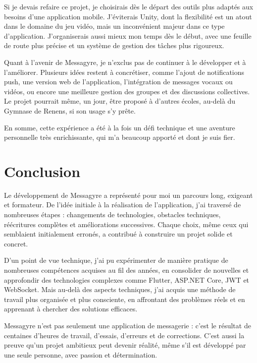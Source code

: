 \documentclass[12pt]{report}
\begin{document}
	Si je devais refaire ce projet, je choisirais dès le départ des outils plus adaptés aux besoins d’une application mobile. J’éviterais Unity, dont la flexibilité est un atout dans le domaine du jeu vidéo, mais un inconvénient majeur dans ce type d’application. J’organiserais aussi mieux mon temps dès le début, avec une feuille de route plus précise et un système de gestion des tâches plus rigoureux.
	
	Quant à l’avenir de Messagyre, je n’exclus pas de continuer à le développer et à l’améliorer. Plusieurs idées restent à concrétiser, comme l’ajout de notifications push, une version web de l’application, l’intégration de messages vocaux ou vidéos, ou encore une meilleure gestion des groupes et des discussions collectives. Le projet pourrait même, un jour, être proposé à d’autres écoles, au-delà du Gymnase de Renens, si son usage s’y prête.
	
	En somme, cette expérience a été à la fois un défi technique et une aventure personnelle très enrichissante, qui m’a beaucoup apporté et dont je suis fier.
	
	
	\chapter{Conclusion}
	
	Le développement de Messagyre a représenté pour moi un parcours long, exigeant et formateur. De l’idée initiale à la réalisation de l’application, j’ai traversé de nombreuses étapes : changements de technologies, obstacles techniques, réécritures complètes et améliorations successives. Chaque choix, même ceux qui semblaient initialement erronés, a contribué à construire un projet solide et concret.
	
	D’un point de vue technique, j’ai pu expérimenter de manière pratique de nombreuses compétences acquises au fil des années, en consolider de nouvelles et approfondir des technologies complexes comme Flutter, ASP.NET Core, JWT et WebSocket. Mais au-delà des aspects techniques, j’ai acquis une méthode de travail plus organisée et plus consciente, en affrontant des problèmes réels et en apprenant à chercher des solutions efficaces.
	
	Messagyre n’est pas seulement une application de messagerie : c’est le résultat de centaines d’heures de travail, d’essais, d’erreurs et de corrections. C’est aussi la preuve qu’un projet ambitieux peut devenir réalité, même s’il est développé par une seule personne, avec passion et détermination.
	
\end{document}
